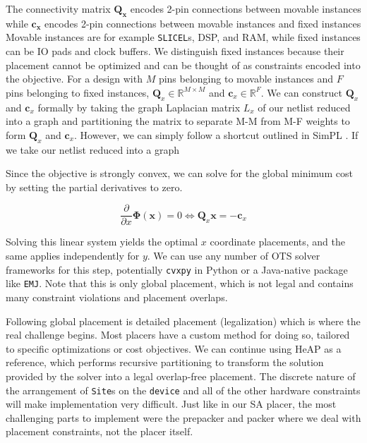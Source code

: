 The connectivity matrix $\boldsymbol{Q_x}$ encodes 2-pin connections between movable instances while $\boldsymbol{c_x}$ encodes 2-pin connections between movable instances and fixed instances   
Movable instances are for example \texttt{SLICEL}s, DSP, and RAM, while fixed instances can be IO pads and clock buffers.
We distinguish fixed instances because their placement cannot be optimized and can be thought of as constraints encoded into the objective.
For a design with $M$ pins belonging to movable instances and $F$ pins belonging to fixed instances, $\boldsymbol{Q}_x \in {\mathbb{R}}^{M \times M}$ and $\boldsymbol{c}_x \in {\mathbb{R}}^F$.
We can construct $\boldsymbol{Q}_x$ and $\boldsymbol{c}_x$ formally by taking the graph Laplacian matrix $L_x$ of our netlist reduced into a graph and partitioning the matrix to separate M-M from M-F weights to form $\boldsymbol{Q}_x$ and $\boldsymbol{c}_x$.
However, we can simply follow a shortcut outlined in SimPL \cite{SimPL}.
If we take our netlist reduced into a graph


Since the objective is strongly convex, we can solve for the global minimum cost by setting the partial derivatives to zero.

\begin{equation}
    \frac{\partial}{\partial x} \boldsymbol{\Phi} (\boldsymbol{x}) = 0 \Longleftrightarrow \boldsymbol{Q}_x \boldsymbol{x} = - \boldsymbol{c}_x
\end{equation}

Solving this linear system yields the optimal $x$ coordinate placements, and the same applies independently for $y$.
We can use any number of OTS solver frameworks for this step, potentially \texttt{cvxpy} in Python or a Java-native package like \texttt{EMJ}.
Note that this is only global placement, which is not legal and contains many constraint violations and placement overlaps.

Following global placement is detailed placement (legalization) which is where the real challenge begins.
Most placers have a custom method for doing so, tailored to specific optimizations or cost objectives.
We can continue using HeAP as a reference, which performs recursive partitioning to transform the solution provided by the solver into a legal overlap-free placement.
The discrete nature of the arrangement of \texttt{Site}s on the \texttt{device} and all of the other hardware constraints will make implementation very difficult.
Just like in our SA placer, the most challenging parts to implement were the prepacker and packer where we deal with placement constraints, not the placer itself.

